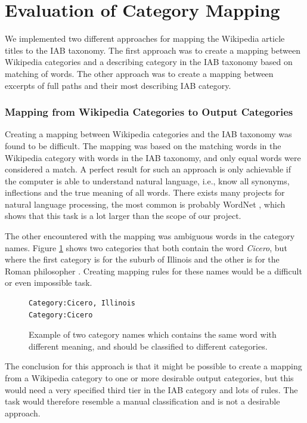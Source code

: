 \section{Evaluation of Category Mapping}
We implemented two different approaches for mapping the Wikipedia article titles to the IAB taxonomy. The first approach was to create a mapping between Wikipedia categories and a describing category in the IAB taxonomy based on matching of words. The other approach was to create a mapping between excerpts of full paths and their most describing IAB category.

\subsubsection{Mapping from Wikipedia Categories to Output Categories}
Creating a mapping between Wikipedia categories and the IAB taxonomy was found to be difficult. The mapping was based on the matching words in the Wikipedia category with words in the IAB taxonomy, and only equal words were considered a match. A perfect result for such an approach is only achievable if the computer is able to understand natural language, i.e., know all synonyms, inflections and the true meaning of all words. There exists many projects for natural language processing, the most common is probably WordNet \cite{wordnet}, which shows that this task is a lot larger than the scope of our project. 

The other encountered with the mapping was ambiguous words in the category names. Figure \ref{fig:ambiguous_category_name} shows two categories that both contain the word \emph{Cicero}, but where the first category is for the suburb of Illinois \cite{wiki:ciceroillinois} and the other is for the Roman philosopher \cite{wiki:ciceroroman}. Creating mapping rules for these names would be a difficult or even impossible task. 

\begin{figure}[h]
\centering
\begin{lstlisting}
Category:Cicero, Illinois
Category:Cicero
\end{lstlisting}
\caption[Similar category names with different meaning]{Example of two category names which contains the same word with different meaning, and should be classified to different categories.}
\label{fig:ambiguous_category_name}
\end{figure}


The conclusion for this approach is that it might be possible to create a mapping from a Wikipedia category to one or more desirable output categories, but this would need a very specified third tier in the IAB category and lots of rules. The task would therefore resemble a manual classification and is not a desirable approach. 

